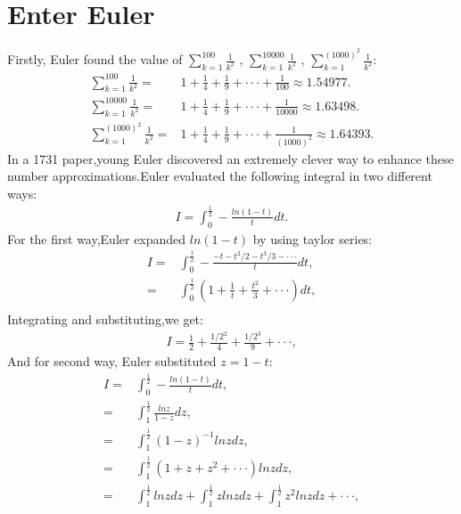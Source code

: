 \documentclass[a4paper,reqno,11pt]{book}
\theoremstyle{plain}%
\theoremstyle{definition}
\begin{document}
\section{Enter Euler}
Firstly, Euler found the value of $\sum_{k=1}^{100}\frac{1}{k^2}$ , $\sum_{k=1}^{10000}\frac{1}{k^2}$ , $\sum_{k=1}^{(1000)^2}\frac{1}{k^2}$:\\
\begin{align*}
    \sum_{k=1}^{100}\frac{1}{k^2}=&1+\frac{1}{4}+\frac{1}{9}+\cdot\cdot\cdot+\frac{1}{100}\approx1.54977.\\
    \sum_{k=1}^{10000}\frac{1}{k^2}=&1+\frac{1}{4}+\frac{1}{9}+\cdot\cdot\cdot+\frac{1}{10000}\approx1.63498.\\
    \sum_{k=1}^{(1000)^2}\frac{1}{k^2}=&1+\frac{1}{4}+\frac{1}{9}+\cdot\cdot\cdot+\frac{1}{(1000)^2}\approx1.64393.
\end{align*}
In a 1731 paper,young Euler discovered an extremely clever way to enhance these number approximations.Euler evaluated the following integral in two different ways:
\begin{eqnarray*}
   I=\int_{0}^{\frac{1}{2}}-\frac{ln(1-t)}{t}dt.
\end{eqnarray*}
For the first way,Euler expanded $ln(1-t)$ by using taylor series:\\
\begin{align*}
    I=&\int_{0}^{\frac{1}{2}}-\frac{-t-t^2/2-t^3/3-\cdot\cdot\cdot}{t}dt,\\
    =&\int_{0}^{\frac{1}{2}}\left(1+\frac{1}{t}+\frac{t^2}{3}+\cdot\cdot\cdot\right)dt,\\
\end{align*}
Integrating and substituting,we get:\\
\begin{eqnarray*}
    I=\frac{1}{2}+\frac{1/2^2}{4}+\frac{1/2^3}{9}+\cdot\cdot\cdot,
\end{eqnarray*}
And for second way, Euler substituted $z=1-t$:\\
\begin{align*}
    I=&\int_{0}^{\frac{1}{2}}-\frac{ln(1-t)}{t}dt,\\
     =&\int_{1}^{\frac{1}{2}}\frac{lnz}{1-z}dz,\\
     =&\int_{1}^{\frac{1}{2}}(1-z)^{-1}lnzdz,\\
     =&\int_{1}^{\frac{1}{2}}(1+z+z^2+\cdot\cdot\cdot)lnzdz,\\
     =&\int_{1}^{\frac{1}{2}}lnzdz+\int_{1}^{\frac{1}{2}}zlnzdz+\int_{1}^{\frac{1}{2}}z^2lnzdz+\cdot\cdot\cdot,
\end{align*}
\end{document}
